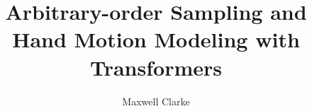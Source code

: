 \documentclass[12pt, a4paper, twoside, openright]{book}
\begin{document}
\frontmatter


\title{Arbitrary-order Sampling and Hand Motion Modeling with Transformers}
\author{Maxwell Clarke}

\subject{Computer Science}


\mscbothparts







\maketitle



\tableofcontents
\clearpage

\listoffigures

\listoftables
\cleardoublepage


\mainmatter

















%
\printbibliography
\end{document}
